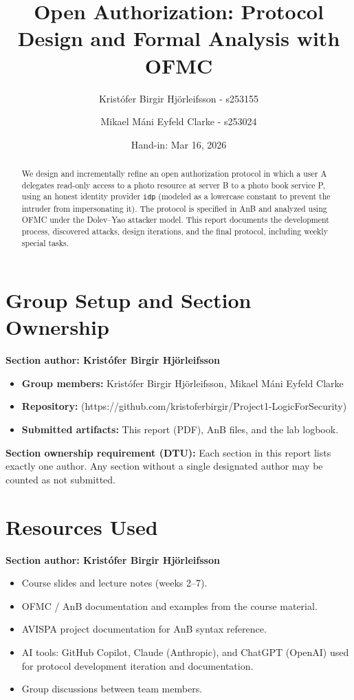 \documentclass[11pt,a4paper]{article}
\title{Open Authorization: Protocol Design and Formal Analysis with OFMC}
\author{
  Kristófer Birgir Hjörleifsson - s253155 \and Mikael Máni Eyfeld Clarke - s253024
}
\date{Hand-in: Mar 16, 2026}
\newcommand{\sectionauthor}[1]{\noindent\textbf{Section author: #1}\par\medskip}
\begin{document}
\maketitle

\begin{abstract}
We design and incrementally refine an open authorization protocol in which a user A delegates
read-only access to a photo resource at server B to a photo book service P, using an honest identity
provider \texttt{idp} (modeled as a lowercase constant to prevent the intruder from impersonating it).
The protocol is specified in AnB and analyzed using OFMC under the Dolev--Yao attacker
model. This report documents the development process, discovered attacks, design iterations, and the
final protocol, including weekly special tasks.
\end{abstract}

\tableofcontents
\newpage

\section{Group Setup and Section Ownership}
\sectionauthor{Kristófer Birgir Hjörleifsson}

\begin{itemize}[leftmargin=*]
  \item \textbf{Group members:} Kristófer Birgir Hjörleifsson, Mikael Máni Eyfeld Clarke
  \item \textbf{Repository:} (https://github.com/kristoferbirgir/Project1-LogicForSecurity)
  \item \textbf{Submitted artifacts:} This report (PDF), AnB files, and the lab logbook.
\end{itemize}

\noindent\textbf{Section ownership requirement (DTU):} Each section in this report lists exactly one
author. Any section without a single designated author may be counted as not submitted.

\section{Resources Used}
\sectionauthor{Kristófer Birgir Hjörleifsson}

\begin{itemize}[leftmargin=*]
  \item Course slides and lecture notes (weeks 2--7).
  \item OFMC / AnB documentation and examples from the course material.
  \item AVISPA project documentation for AnB syntax reference.
  \item AI tools: GitHub Copilot, Claude (Anthropic), and ChatGPT (OpenAI) used for protocol development iteration and documentation.
  \item Group discussions between team members.
\end{itemize}
\end{document}
